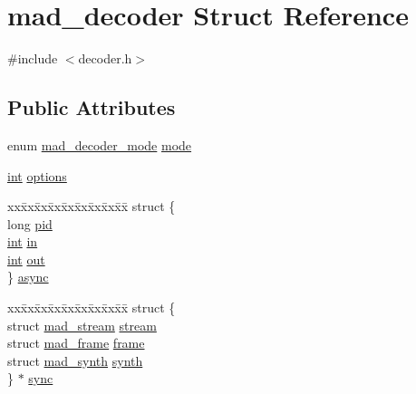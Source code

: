 \hypertarget{structmad__decoder}{}\section{mad\+\_\+decoder Struct Reference}
\label{structmad__decoder}


{\ttfamily \#include $<$decoder.\+h$>$}

\subsection*{Public Attributes}
\begin{DoxyCompactItemize}
\item 
enum \hyperlink{libmad_2decoder_8h_a0d55d67e9f9acf69f677f86053e88b6a}{mad\+\_\+decoder\+\_\+mode} \hyperlink{structmad__decoder_a4b099e23e17617d7b71d08d10eed7d08}{mode}
\item 
\hyperlink{xmltok_8h_a5a0d4a5641ce434f1d23533f2b2e6653}{int} \hyperlink{structmad__decoder_ae9aa89b5fdbe3927bc168f4334f88196}{options}
\item 
\begin{tabbing}
xx\=xx\=xx\=xx\=xx\=xx\=xx\=xx\=xx\=\kill
struct \{\\
\>long \hyperlink{structmad__decoder_a72d64fb82706560651ec3ee6cbf500d2}{pid}\\
\>\hyperlink{xmltok_8h_a5a0d4a5641ce434f1d23533f2b2e6653}{int} \hyperlink{structmad__decoder_aecedf7b9ab4d0dd3c8817dc96c07f28e}{in}\\
\>\hyperlink{xmltok_8h_a5a0d4a5641ce434f1d23533f2b2e6653}{int} \hyperlink{structmad__decoder_af4e6ba82d0062976edd0b0ca886c1c1e}{out}\\
\} \hyperlink{structmad__decoder_a18bc16b02d6ef1f04d6c5d3e63222a37}{async}\\

\end{tabbing}\item 
\begin{tabbing}
xx\=xx\=xx\=xx\=xx\=xx\=xx\=xx\=xx\=\kill
struct \{\\
\>struct \hyperlink{structmad__stream}{mad\_stream} \hyperlink{structmad__decoder_a4d0b89b70cb6bbc3172a222ba9c751d1}{stream}\\
\>struct \hyperlink{structmad__frame}{mad\_frame} \hyperlink{structmad__decoder_a35cf3f7b3aaa4336718ff1896808bd70}{frame}\\
\>struct \hyperlink{structmad__synth}{mad\_synth} \hyperlink{structmad__decoder_a7fda021db48c654ff0db728dd5c040a3}{synth}\\
\} $\ast$ \hyperlink{structmad__decoder_a6359ac37316b99762cf64a4a1be8e3ea}{sync}\\


\end{tabbing}
\end{DoxyCompactItemize}
